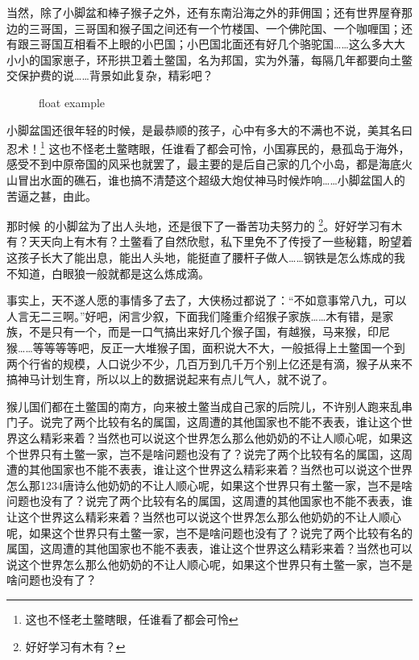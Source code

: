\documentclass{article}%
\begin{document}

\drawgrid{\linewidth}%
当然，除了小脚盆和棒子猴子之外，还有东南沿海之外的菲佣国；还有世界屋脊那边的三哥国，三哥国和猴子国之间还有一个竹楼国、一个佛陀国、一个咖喱国；还有跟三哥国互相看不上眼的小巴国；小巴国北面还有好几个骆驼国……这么多大大小小的国家崽子，环形拱卫着土鳖国，名为邦国，实为外藩，每隔几年都要向土鳖交保护费的说……背景如此复杂，精彩吧？


\begin{figure}[b]
  \centering
  \caption{float example\protect{}}\label{fig:floateg}
\end{figure}

\newlength{\zitigao}

小脚盆国还很年轻的时候，是最恭顺的孩子，心中有多大的不满也不说，美其名曰忍术！\footnote{这也不怪老土鳖瞎眼，任谁看了都会可怜}
这也不怪老土鳖瞎眼，任谁看了都会可怜，小国寡民的，悬孤岛于海外，感受不到中原帝国的风采也就罢了，最主要的是后自己家的几个小岛，都是海底火山冒出水面的礁石，谁也搞不清楚这个超级大炮仗神马时候炸响……小脚盆国人的苦逼之甚，由此。\the\baselineskip\the\zitigao

那时候%
的小脚盆为了出人头地，还是很下了一番苦功夫努力的
\footnote{好好学习有木有？}。好好学习有木有？天天向上有木有？土鳖看了自然欣慰，私下里免不了传授了一些秘籍，盼望着这孩子长大了能出息，能出人头地，能挺直了腰杆子做人……钢铁是怎么炼成的我不知道，白眼狼一般就都是这么炼成滴。

事实上，天不遂人愿的事情多了去了，大侠杨过都说了：“不如意事常八九，可以人言无二三啊。”好吧，闲言少叙，下面我们隆重介绍猴子家族……木有错，是家族，不是只有一个，而是一口气搞出来好几个猴子国，有越猴，马来猴，印尼猴……等等等等吧，反正一大堆猴子国，面积说大不大，一般抵得上土鳖国一个到两个行省的规模，人口说少不少，几百万到几千万个别上亿还是有滴，猴子从来不搞神马计划生育，所以以上的数据说起来有点儿气人，就不说了。

猴儿国们都在土鳖国的南方，向来被土鳖当成自己家的后院儿，不许别人跑来乱串门子。说完了两个比较有名的属国，这周遭的其他国家也不能不表表，谁让这个世界这么精彩来着？当然也可以说这个世界怎么那么他奶奶的不让人顺心呢，如果这个世界只有土鳖一家，岂不是啥问题也没有了？说完了两个比较有名的属国，这周遭的其他国家也不能不表表，谁让这个世界这么精彩来着？当然也可以说这个世界怎么那1234唐诗么他奶奶的不让人顺心呢，如果这个世界只有土鳖一家，岂不是啥问题也没有了？说完了两个比较有名的属国，这周遭的其他国家也不能不表表，谁让这个世界这么精彩来着？当然也可以说这个世界怎么那么他奶奶的不让人顺心呢，如果这个世界只有土鳖一家，岂不是啥问题也没有了？说完了两个比较有名的属国，这周遭的其他国家也不能不表表，谁让这个世界这么精彩来着？当然也可以说这个世界怎么那么他奶奶的不让人顺心呢，如果这个世界只有土鳖一家，岂不是啥问题也没有了？
\end{document}
